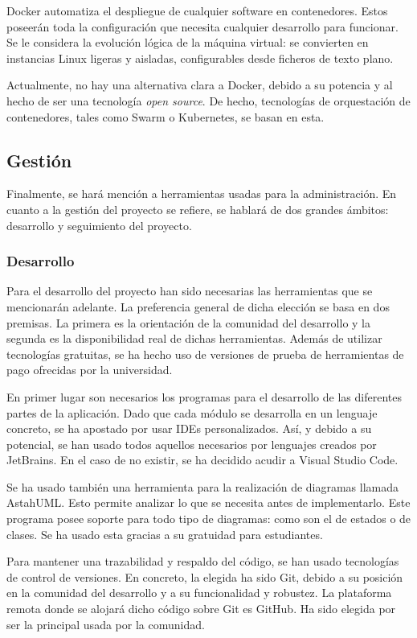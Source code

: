 Docker automatiza el despliegue de cualquier software en contenedores. Estos poseerán toda la configuración que necesita cualquier desarrollo para funcionar. Se le considera la evolución lógica de la máquina virtual: se convierten en instancias Linux ligeras y aisladas, configurables desde ficheros de texto plano.

Actualmente, no hay una alternativa clara a Docker, debido a su potencia y al hecho de ser una tecnología \textit{open source}. De hecho, tecnologías de orquestación de contenedores, tales como Swarm o Kubernetes, se basan en esta.

\subsection{Gestión}

Finalmente, se hará mención a herramientas usadas para la administración. En cuanto a la gestión del proyecto se refiere, se hablará de dos grandes ámbitos: desarrollo y seguimiento del proyecto.

\subsubsection{Desarrollo}

Para el desarrollo del proyecto han sido necesarias las herramientas que se mencionarán adelante. La preferencia general de dicha elección se basa en dos premisas. La primera es la orientación de la comunidad del desarrollo y la segunda es la disponibilidad real de dichas herramientas. Además de utilizar tecnologías gratuitas, se ha hecho uso de versiones de prueba de herramientas de pago ofrecidas por la universidad.

En primer lugar son necesarios los programas para el desarrollo de las diferentes partes de la aplicación. Dado que cada módulo se desarrolla en un lenguaje concreto, se ha apostado por usar IDEs personalizados. Así, y debido a su potencial, se han usado todos aquellos necesarios por lenguajes creados por JetBrains. En el caso de no existir, se ha decidido acudir a Visual Studio Code.

Se ha usado también una herramienta para la realización de diagramas llamada AstahUML. Esto permite analizar lo que se necesita antes de implementarlo. Este programa posee soporte para todo tipo de diagramas: como son el de estados o de clases. Se ha usado esta gracias a su gratuidad para estudiantes.

Para mantener una trazabilidad y respaldo del código, se han usado tecnologías de control de versiones. En concreto, la elegida ha sido Git, debido a su posición en la comunidad del desarrollo y a su funcionalidad y robustez. La plataforma remota donde se alojará dicho código sobre Git es GitHub. Ha sido elegida por ser la principal usada por la comunidad.

